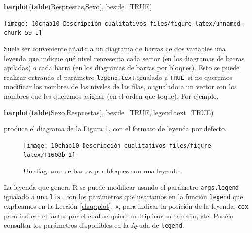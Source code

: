 \documentclass[
]{book}
\newenvironment{Shaded}{\begin{snugshade}}{\end{snugshade}}
\newcommand{\DataTypeTok}[1]{\textcolor[rgb]{0.13,0.29,0.53}{#1}}
\newcommand{\KeywordTok}[1]{\textcolor[rgb]{0.13,0.29,0.53}{\textbf{#1}}}
\newcommand{\NormalTok}[1]{#1}
\newcommand{\OtherTok}[1]{\textcolor[rgb]{0.56,0.35,0.01}{#1}}
\theoremstyle{definition}
\theoremstyle{definition}
\theoremstyle{definition}
\theoremstyle{remark}
\begin{document}
\begin{Shaded}
\begin{Highlighting}[]
\KeywordTok{barplot}\NormalTok{(}\KeywordTok{table}\NormalTok{(Respuestas,Sexo), }\DataTypeTok{beside=}\OtherTok{TRUE}\NormalTok{)}
\end{Highlighting}
\end{Shaded}

\begin{center}\texttt{[image: 10chap10\_Descripción\_cualitativos\_files/figure-latex/unnamed-chunk-59-1]} \end{center}

Suele ser conveniente añadir a un diagrama de barras de dos variables una leyenda que indique qué nivel representa cada sector (en los diagramas de barras apiladas) o cada barra (en los diagramas de barras por bloques). Esto se puede realizar entrando el parámetro \texttt{legend.text} igualado a \texttt{TRUE}, si no queremos modificar los nombres de los niveles de las filas, o igualado a un vector con los nombres que les queremos asignar (en el orden que toque).
Por ejemplo,

\begin{Shaded}
\begin{Highlighting}[]
\KeywordTok{barplot}\NormalTok{(}\KeywordTok{table}\NormalTok{(Sexo,Respuestas), }\DataTypeTok{beside=}\OtherTok{TRUE}\NormalTok{, }\DataTypeTok{legend.text=}\OtherTok{TRUE}\NormalTok{)}
\end{Highlighting}
\end{Shaded}

produce el diagrama de la Figura \ref{fig:F1608b}, con el formato de leyenda por defecto.

\begin{figure}

{\centering \texttt{[image: 10chap10\_Descripción\_cualitativos\_files/figure-latex/F1608b-1]} 

}

\caption{Un diagrama de barras por bloques con una leyenda.}\label{fig:F1608b}
\end{figure}

La leyenda que genera R se puede modificar usando el parámetro \texttt{args.legend} igualado a una \texttt{list} con los parámetros que usaríamos en la función \texttt{legend} que explicamos en la Lección \ref{chap:plot}: \texttt{x}, para indicar la posición de la leyenda, \texttt{cex} para indicar el factor por el cual se quiere multiplicar su tamaño, etc.
Podéis consultar los parámetros disponibles en la Ayuda de \texttt{legend}.
\end{document}
